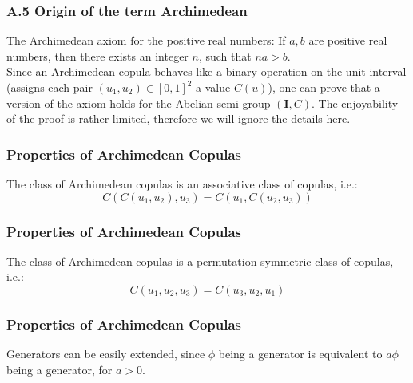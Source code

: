 \documentclass{beamer}
\begin{document}
\begin{frame}
\frametitle{A.5 Origin of the term Archimedean}
The Archimedean axiom for the positive real numbers:
If $a, b$ are positive real numbers, then there exists an integer $n$, such that $na > b$. \\
Since an Archimedean copula behaves like a binary operation on the unit interval (assigns each pair $(u_1, u_2) \in [0, 1]^2$ a value $C(u)$), one can prove that a version of the axiom holds for the Abelian semi-group $(\textbf{I}, C)$.
The enjoyability of the proof is rather limited, therefore we will ignore the details here.

\end{frame}


\begin{frame}
\frametitle{Properties of Archimedean Copulas}

The class of Archimedean copulas is an associative class of copulas, i.e.:
\[C(C(u_1, u_2), u_3) = C(u_1, C(u_2, u_3))\]

\end{frame}

\begin{frame}
\frametitle{Properties of Archimedean Copulas}

The class of Archimedean copulas is a permutation-symmetric class of copulas, i.e.:
\[C(u_1, u_2, u_3) = C(u_3, u_2, u_1)\]

\end{frame}

\begin{frame}
\frametitle{Properties of Archimedean Copulas}

Generators can be easily extended, since $\phi$ being a generator is equivalent to $a\phi$ being a generator, for $a > 0$.

\end{frame}






\end{document}
